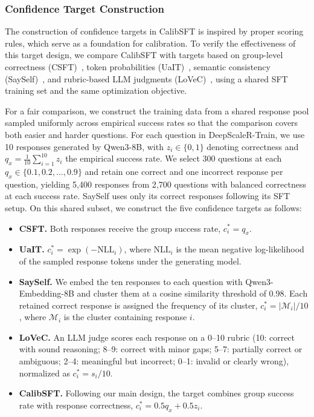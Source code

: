 \documentclass{article} %
\begin{document}
\subsubsection{Confidence Target Construction}
\label{sec:target_construction_setup}



The construction of confidence targets in CalibSFT is inspired by proper scoring rules, which serve as a foundation for calibration.
To verify the effectiveness of this target design, we compare CalibSFT
with targets based on group-level correctness (CSFT)~\citep{jang2025verbalized},
token probabilities (UaIT)~\citep{liu2024uncertainty}, semantic consistency
(SaySelf)~\citep{xu2024sayself}, and rubric-based LLM judgments
(LoVeC)~\citep{zhang2026lovec}, using a shared SFT training set and the same
optimization objective.

For a fair comparison, we construct the training data from a shared response
pool sampled uniformly across empirical success rates so that the comparison
covers both easier and harder questions. For each question in
DeepScaleR-Train, we use 10 responses generated by Qwen3-8B, with $z_i\in\{0,1\}$
denoting correctness and $q_x=\frac{1}{10}\sum_{i=1}^{10}z_i$ the empirical
success rate. We select 300 questions at each $q_x\in\{0.1,0.2,\ldots,0.9\}$
and retain one correct and one incorrect response per question, yielding
5{,}400 responses from 2{,}700 questions with balanced correctness at each
success rate. SaySelf uses only its correct responses following its SFT setup.
On this shared subset, we construct the five confidence targets as follows:

\begin{itemize}
    \item \textbf{CSFT.} Both responses receive the group success rate, $c_i^*=q_x$.

    \item \textbf{UaIT.} $c_i^*=\exp(-\mathrm{NLL}_i)$, where $\mathrm{NLL}_i$ is the mean negative log-likelihood of the sampled response tokens under the generating model.

    \item \textbf{SaySelf.} We embed the ten responses to each question with Qwen3-Embedding-8B and cluster them at a cosine similarity threshold of 0.98. Each retained correct response is assigned the frequency of its cluster, $c_i^*=|\mathcal M_i|/10$, where $\mathcal M_i$ is the cluster containing response $i$.

    \item \textbf{LoVeC.} An LLM judge scores each response on a 0--10 rubric (10: correct with sound reasoning; 8--9: correct with minor gaps; 5--7: partially correct or ambiguous; 2--4: meaningful but incorrect; 0--1: invalid or clearly wrong), normalized as $c_i^*=s_i/10$.

    \item \textbf{CalibSFT.} Following our main design, the target combines group success rate with response correctness, $c_i^*=0.5q_x+0.5z_i$.
\end{itemize}
\end{document}
